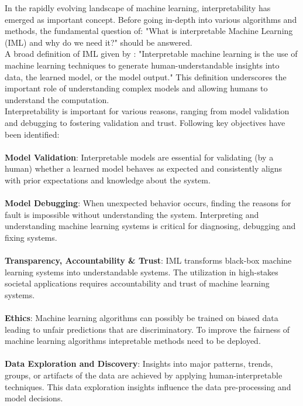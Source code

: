 In the rapidly evolving landscape of machine learning, interpretability has emerged as important concept. Before going in-depth into various algorithms and methods, the fundamental question of: "What is interpretable Machine Learning (IML) and why do we need it?" should be answered.
\\
A broad definition of IML given by \cite{allen2023interpretable}: "Interpretable machine learning  is the use of machine learning techniques to generate human-understandable insights into data, the learned model, or the model output." This definition underscores the important role of understanding complex models and allowing humans to understand the computation.
\\
Interpretability is important for various reasons, ranging from model validation and debugging to fostering validation and trust. Following key objectives have been identified: \cite{murdoch2019definitions} \cite{Roscher2020explainable} \cite{molnar2022} \cite{guidotti2018survey} \cite{lipton2017mythos} \cite{du2019techniques} \cite{carvalho2019machine} \cite{doshivelez2017rigorous}
\\\\
\textbf{Model Validation}: Interpretable models are essential for validating (by a human) whether a learned model behaves as expected and consistently aligns with prior expectations and knowledge about the system.
\\\\
\textbf{Model Debugging}: When unexpected behavior occurs, finding the reasons for fault is impossible without understanding the system. Interpreting and understanding machine learning systems is critical for diagnosing, debugging and fixing systems. \cite{koh2020understanding}
\\\\
\textbf{Transparency, Accountability \& Trust}: IML transforms black-box machine learning systems into understandable systems. The utilization in high-stakes societal applications requires accountability and trust of machine learning systems. \cite{rudin2019stop} \cite{Samek_2019} \cite{xu2019inbook}
\\\\
\textbf{Ethics}: Machine learning algorithms can possibly be trained on biased data leading to unfair predictions that are discriminatory. To improve the fairness of machine learning algorithms intepretable methods need to be deployed. \cite{guidotti2018survey}
\\\\
\textbf{Data Exploration and Discovery}: Insights into major patterns, trends, groups, or artifacts of the data are achieved by applying human-interpretable techniques. This data exploration insights influence the data pre-processing and model decisions. \cite{murdoch2019definitions} \cite{berkhin2006} \cite{tukey1981}



